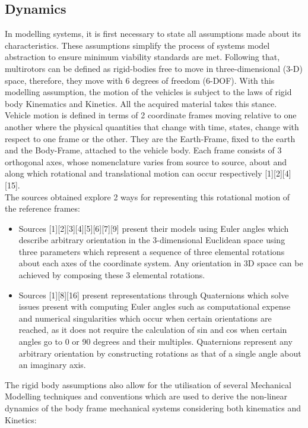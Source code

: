\documentclass[12pt,a4paper,twoside]{report}
\begin{document}
			\subsection*{Dynamics}
				In modelling systems, it is first necessary to state all assumptions made about its characteristics. These assumptions simplify the process of systems model abstraction to ensure minimum viability standards are met. Following that, multirotors can be defined as rigid-bodies free to move in three-dimensional (3-D) space, therefore, they move with 6 degrees of freedom (6-DOF). With this modelling assumption, the motion of the vehicles is subject to the laws of rigid body Kinematics and Kinetics. All the acquired material takes this stance. 
				\\
				Vehicle motion is defined in terms of 2 coordinate frames moving relative to one another where the physical quantities that change with time, states, change with respect to one frame or the other. They are the Earth-Frame, fixed to the earth and the Body-Frame, attached to the vehicle body. Each frame consists of 3 orthogonal axes, whose nomenclature varies from source to source, about and along which rotational and translational motion can occur respectively [1][2][4][15]. 
				\\
				The sources obtained explore 2 ways for representing this rotational motion of the reference frames:
				
				\begin{itemize}
					\item 
						Sources [1][2][3][4][5][6][7][9] present their models using Euler angles which describe arbitrary orientation in the 3-dimensional Euclidean space using three parameters which represent a sequence of three elemental rotations about each axes of the coordinate system. Any orientation in 3D space can be achieved by composing these 3 elemental rotations.
					\item
						Sources [1][8][16] present representations through Quaternions which solve issues present with computing Euler angles such as computational expense and numerical singularities which occur when certain orientations are reached, as it does not require the calculation of sin and cos when certain angles go to 0 or 90 degrees and their multiples. Quaternions represent any arbitrary orientation by constructing rotations as that of a single angle about an imaginary axis. 
				\end{itemize}
				\space
				The rigid body assumptions also allow for the utilisation of several Mechanical Modelling techniques and conventions which are used to derive the non-linear dynamics of the body frame mechanical systems considering both kinematics and Kinetics:
				
\end{document}
